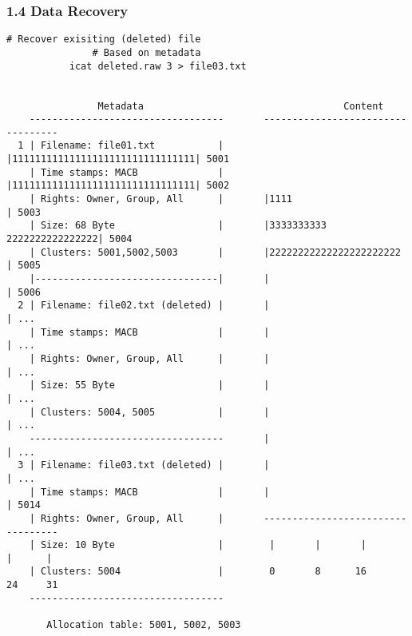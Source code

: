 \begin{frame}[fragile]
  \frametitle{1.4 Data Recovery}
  \begin{lstlisting}[basicstyle=\tiny\ttfamily]
	       # Recover exisiting (deleted) file
               # Based on metadata
	       icat deleted.raw 3 > file03.txt
                            

                Metadata                                   Content     
    ----------------------------------       ----------------------------------
  1 | Filename: file01.txt           |       |11111111111111111111111111111111| 5001
    | Time stamps: MACB              |       |11111111111111111111111111111111| 5002
    | Rights: Owner, Group, All      |       |1111                            | 5003
    | Size: 68 Byte                  |       |3333333333      2222222222222222| 5004
    | Clusters: 5001,5002,5003       |       |22222222222222222222222         | 5005
    |--------------------------------|       |                                | 5006
  2 | Filename: file02.txt (deleted) |       |                                | ...
    | Time stamps: MACB              |       |                                | ...
    | Rights: Owner, Group, All      |       |                                | ...
    | Size: 55 Byte                  |       |                                | ...
    | Clusters: 5004, 5005           |       |                                | ...
    ----------------------------------       |                                | ...
  3 | Filename: file03.txt (deleted) |       |                                | ...
    | Time stamps: MACB              |       |                                | 5014
    | Rights: Owner, Group, All      |       ----------------------------------
    | Size: 10 Byte                  |        |       |       |       |      |
    | Clusters: 5004                 |        0       8      16      24     31
    ----------------------------------

       Allocation table: 5001, 5002, 5003
  \end{lstlisting}
\end{frame}


